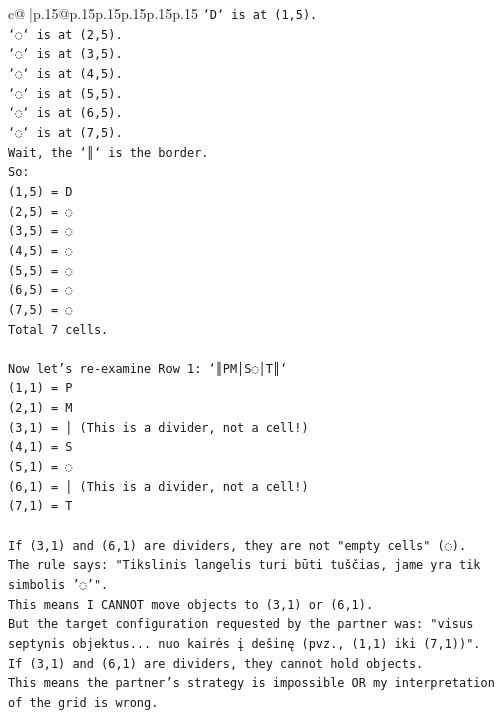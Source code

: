 \documentclass{article}
\begin{document}
{\begin{supertabular}{c@{$\;$}|p{.15\linewidth}@{}p{.15\linewidth}p{.15\linewidth}p{.15\linewidth}p{.15\linewidth}p{.15\linewidth}}
{{{\texttt{`D` is at (1,5).} \\
\texttt{`◌` is at (2,5).} \\
\texttt{`◌` is at (3,5).} \\
\texttt{`◌` is at (4,5).} \\
\texttt{`◌` is at (5,5).} \\
\texttt{`◌` is at (6,5).} \\
\texttt{`◌` is at (7,5).} \\
\texttt{Wait, the `║` is the border.} \\
\texttt{So:} \\
\texttt{(1,5) = D} \\
\texttt{(2,5) = ◌} \\
\texttt{(3,5) = ◌} \\
\texttt{(4,5) = ◌} \\
\texttt{(5,5) = ◌} \\
\texttt{(6,5) = ◌} \\
\texttt{(7,5) = ◌} \\
\texttt{Total 7 cells.} \\
\\ 
\texttt{Now let's re{-}examine Row 1: `║PM│S◌│T║`} \\
\texttt{(1,1) = P} \\
\texttt{(2,1) = M} \\
\texttt{(3,1) = │ (This is a divider, not a cell!)} \\
\texttt{(4,1) = S} \\
\texttt{(5,1) = ◌} \\
\texttt{(6,1) = │ (This is a divider, not a cell!)} \\
\texttt{(7,1) = T} \\
\\ 
\texttt{If (3,1) and (6,1) are dividers, they are not "empty cells" (◌).} \\
\texttt{The rule says: "Tikslinis langelis turi būti tuščias, jame yra tik simbolis '◌'".} \\
\texttt{This means I CANNOT move objects to (3,1) or (6,1).} \\
\texttt{But the target configuration requested by the partner was: "visus septynis objektus... nuo kairės į dešinę (pvz., (1,1) iki (7,1))".} \\
\texttt{If (3,1) and (6,1) are dividers, they cannot hold objects.} \\
\texttt{This means the partner's strategy is impossible OR my interpretation of the grid is wrong.} \\
\\ 
}}}
\end{supertabular}}
\end{document}

